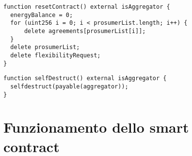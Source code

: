 \begin{verbatim}
function resetContract() external isAggregator {
  energyBalance = 0;
  for (uint256 i = 0; i < prosumerList.length; i++) {
      delete agreements[prosumerList[i]];
  }
  delete prosumerList;
  delete flexibilityRequest;
}
\end{verbatim}

\begin{verbatim}
function selfDestruct() external isAggregator {
  selfdestruct(payable(aggregator));
}
\end{verbatim}

\section{Funzionamento dello smart contract}

